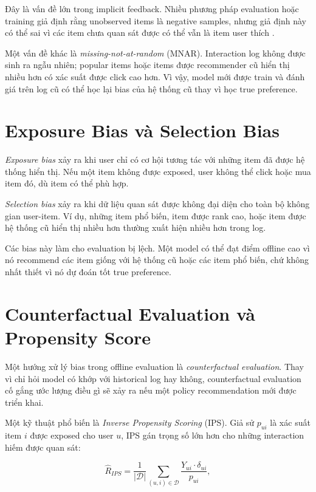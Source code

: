 \documentclass[12pt,a4paper]{article}
\begin{document}
Đây là vấn đề lớn trong implicit feedback. 
Nhiều phương pháp evaluation hoặc training giả định rằng unobserved items là negative samples, nhưng giả định này có thể sai vì các item chưa quan sát được có thể vẫn là item user thích \cite{saito2020unbiased}.

Một vấn đề khác là \textit{missing-not-at-random} (MNAR). 
Interaction log không được sinh ra ngẫu nhiên; popular items hoặc items được recommender cũ hiển thị nhiều hơn có xác suất được click cao hơn. 
Vì vậy, model mới được train và đánh giá trên log cũ có thể học lại bias của hệ thống cũ thay vì học true preference.

\section{Exposure Bias và Selection Bias}

\textit{Exposure bias} xảy ra khi user chỉ có cơ hội tương tác với những item đã được hệ thống hiển thị. 
Nếu một item không được exposed, user không thể click hoặc mua item đó, dù item có thể phù hợp.

\textit{Selection bias} xảy ra khi dữ liệu quan sát được không đại diện cho toàn bộ không gian user-item. 
Ví dụ, những item phổ biến, item được rank cao, hoặc item được hệ thống cũ hiển thị nhiều hơn thường xuất hiện nhiều hơn trong log.

Các bias này làm cho evaluation bị lệch. 
Một model có thể đạt điểm offline cao vì nó recommend các item giống với hệ thống cũ hoặc các item phổ biến, chứ không nhất thiết vì nó dự đoán tốt true preference.

\section{Counterfactual Evaluation và Propensity Score}

Một hướng xử lý bias trong offline evaluation là \textit{counterfactual evaluation}. 
Thay vì chỉ hỏi model có khớp với historical log hay không, counterfactual evaluation cố gắng ước lượng điều gì sẽ xảy ra nếu một policy recommendation mới được triển khai.

Một kỹ thuật phổ biến là \textit{Inverse Propensity Scoring} (IPS). 
Giả sử $p_{ui}$ là xác suất item $i$ được exposed cho user $u$, IPS gán trọng số lớn hơn cho những interaction hiếm được quan sát:

\begin{equation}
\hat{R}_{IPS} = \frac{1}{|\mathcal{D}|} \sum_{(u,i) \in \mathcal{D}} \frac{Y_{ui} \cdot \delta_{ui}}{p_{ui}},
\end{equation}
\end{document}
